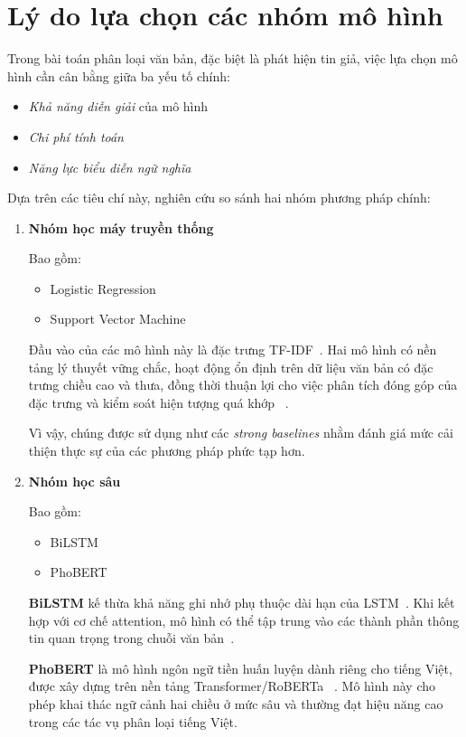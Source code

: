 \documentclass[12pt, a4paper]{report}
\begin{document}
\section{Lý do lựa chọn các nhóm mô hình}
\label{sec:model_selection}

Trong bài toán phân loại văn bản, đặc biệt là phát hiện tin giả,
việc lựa chọn mô hình cần cân bằng giữa ba yếu tố chính:

\begin{itemize}
    \item \textit{Khả năng diễn giải} của mô hình
    \item \textit{Chi phí tính toán}
    \item \textit{Năng lực biểu diễn ngữ nghĩa}
\end{itemize}

Dựa trên các tiêu chí này, nghiên cứu so sánh hai nhóm phương pháp chính:

\begin{enumerate}
    \item \textbf{Nhóm học máy truyền thống}

    Bao gồm:
    \begin{itemize}
        \item Logistic Regression
        \item Support Vector Machine
    \end{itemize}

    Đầu vào của các mô hình này là đặc trưng TF-IDF~\cite{sparkjones1972idf}.
    Hai mô hình có nền tảng lý thuyết vững chắc, hoạt động ổn định trên dữ
    liệu văn bản có đặc trưng chiều cao và thưa, đồng thời thuận lợi cho việc
    phân tích đóng góp của đặc trưng và kiểm soát hiện tượng quá khớp
    ~\cite{cortes1995svm}.

    Vì vậy, chúng được sử dụng như các \textit{strong baselines} nhằm đánh
    giá mức cải thiện thực sự của các phương pháp phức tạp hơn.

    \item \textbf{Nhóm học sâu}

    Bao gồm:
    \begin{itemize}
        \item BiLSTM
        \item PhoBERT
    \end{itemize}

    \textbf{BiLSTM} kế thừa khả năng ghi nhớ phụ thuộc dài hạn của
    LSTM~\cite{hochreiter1997lstm}. Khi kết hợp với cơ chế attention,
    mô hình có thể tập trung vào các thành phần thông tin quan trọng
    trong chuỗi văn bản~\cite{bahdanau2015attention}.

    \textbf{PhoBERT} là mô hình ngôn ngữ tiền huấn luyện dành riêng cho
    tiếng Việt, được xây dựng trên nền tảng Transformer/RoBERTa
    ~\cite{vaswani2017attention,liu2019roberta,phobert2020}. Mô hình này
    cho phép khai thác ngữ cảnh hai chiều ở mức sâu và thường đạt hiệu
    năng cao trong các tác vụ phân loại tiếng Việt.
\end{enumerate}
\end{document}
